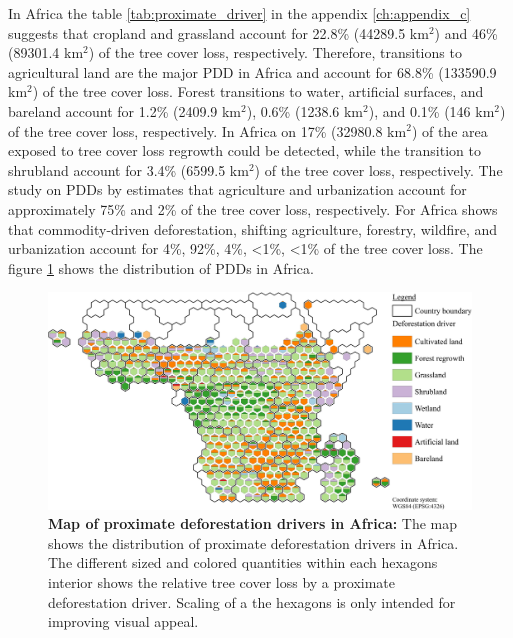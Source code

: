 			In Africa the table \ref{tab:proximate_driver} in the appendix \ref{ch:appendix_c} suggests that cropland and grassland account for 22.8\% (44289.5 km$^2$) and 46\% (89301.4 km$^2$) of the tree cover loss, respectively. Therefore, transitions to agricultural land are the major \ac{PDD} in Africa and account for 68.8\% (133590.9 km$^2$) of the tree cover loss. Forest transitions to water, artificial surfaces, and bareland account for 1.2\% (2409.9 km$^2$), 0.6\% (1238.6 km$^2$), and 0.1\% (146 km$^2$) of the tree cover loss, respectively. In Africa on 17\% (32980.8 km$^2$) of the area exposed to tree cover loss regrowth could be detected, while the transition to shrubland account for 3.4\% (6599.5 km$^2$) of the tree cover loss, respectively. The study on \acp{PDD} by \citet{Hosonuma2012} estimates that agriculture and urbanization account for approximately 75\% and 2\% of the tree cover loss, respectively. For Africa \citet{Curtis2018} shows that commodity-driven deforestation, shifting agriculture, forestry, wildfire, and urbanization account for 4\%, 92\%, 4\%, <1\%, <1\% of the tree cover loss.
			The figure \ref{fig:africa_driver} shows the distribution of \acp{PDD} in Africa.
			\begin{figure}[ht]
				\centering
				\includegraphics[scale=1]{img/africa_driver_frameless}
				\caption[Map of proximate deforestion drivers in Africa]{\textbf{Map of proximate deforestation drivers in Africa:} The map shows the distribution of proximate deforestation drivers in Africa. The different sized and colored quantities within each hexagons interior shows the relative tree cover loss by a proximate deforestation driver. Scaling of a the hexagons is only intended for improving visual appeal.}
				\label{fig:africa_driver}
			\end{figure}

